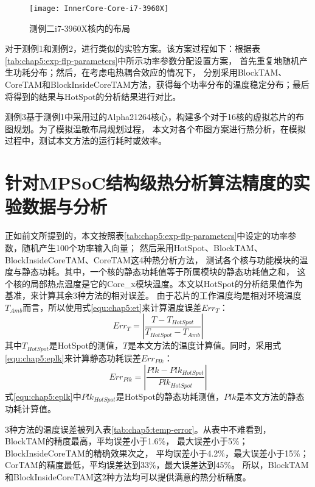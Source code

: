 \begin{figure}[H]
  \centering
  \texttt{[image: InnerCore-Core-i7-3960X]}
  \caption{测例二i7-3960X核内的布局}
  \label{fig:inner-core-core-i7-flp}
\end{figure}

对于测例1和测例2，进行类似的实验方案。该方案过程如下：根据表\ref{tab:chap5:exp-flp-parameters}中所示功率参数分配设置方案， 首先重复地随机产生功耗分布；然后，在考虑电热耦合效应的情况下， 分别采用BlockTAM、CoreTAM和BlockInsideCoreTAM方法，获得每个功率分布的温度稳定分布；最后将得到的结果与HotSpot的分析结果进行对比。

测例3基于测例1中采用过的Alpha21264核心，构建多个对于16核的虚拟芯片的布图规划。为了模拟温敏布局规划过程， 本文对各个布图方案进行热分析，在模拟过程中，测试本文方法的运行耗时或效率。

\section{针对MPSoC结构级热分析算法精度的实验数据与分析}
正如前文所提到的，本文按照表\ref{tab:chap5:exp-flp-parameters}中设定的功率参数，随机产生100个功率输入向量； 然后采用HotSpot、BlockTAM、BlockInsideCoreTAM、CoreTAM这4种热分析方法， 测试各个核与功能模块的温度与静态功耗。其中，一个核的静态功耗值等于所属模块的静态功耗值之和， 这个核的局部热点温度是它的Core\_x模块温度。本文以HotSpot的分析结果值作为基准，来计算其余3种方法的相对误差。 由于芯片的工作温度均是相对环境温度$T_{Amb}$而言，所以使用式\ref{equ:chap5:et}来计算温度误差$Err_T$：
\begin{equation}
\label{equ:chap5:et}
Err_T = |\frac{T-T_{HotSpot}}{T_{HotSpot}-T_{Amb}}|
\end{equation}
其中$T_{HotSpot}$是HotSpot的测值，$T$是本文方法的温度计算值。同时，采用式\ref{equ:chap5:eplk}来计算静态功耗误差$Err_{Plk}$：
\begin{equation}
\label{equ:chap5:eplk}
Err_{Plk} = |\frac{Plk-Plk_{HotSpot}}{Plk_{HotSpot}}|
\end{equation}
式\ref{equ:chap5:eplk}中$Plk_{HotSpot}$是HotSpot的静态功耗测值，$Plk$是本文方法的静态功耗计算值。

3种方法的温度误差被列入表\ref{tab:chap5:temp-error}。从表中不难看到，BlockTAM的精度最高，平均误差小于1.6\%， 最大误差小于5\%；BlockInsideCoreTAM的精确效果次之， 平均误差小于4.2\%，最大误差小于15\%；CorTAM的精度最低，平均误差达到33\%，最大误差达到45\%。 所以，BlockTAM和BlockInsideCoreTAM这2种方法均可以提供满意的热分析精度。

